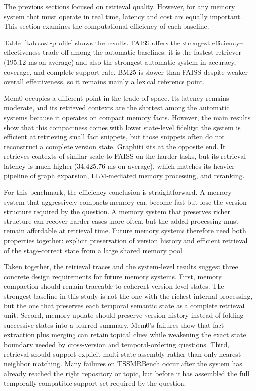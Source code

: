 The previous sections focused on retrieval quality. However, for any memory system that must operate in real time, latency and cost are equally important. This section examines the computational efficiency of each baseline.

Table~\ref{tab:cost-profile} shows the results. FAISS offers the strongest efficiency--effectiveness trade-off among the automatic baselines: it is the fastest retriever (195.12 ms on average) and also the strongest automatic system in accuracy, coverage, and complete-support rate. BM25 is slower than FAISS despite weaker overall effectiveness, so it remains mainly a lexical reference point.

Mem0 occupies a different point in the trade-off space. Its latency remains moderate, and its retrieved contexts are the shortest among the automatic systems because it operates on compact memory facts. However, the main results show that this compactness comes with lower state-level fidelity: the system is efficient at retrieving small fact snippets, but those snippets often do not reconstruct a complete version state. Graphiti sits at the opposite end. It retrieves contexts of similar scale to FAISS on the harder tasks, but its retrieval latency is much higher (34{,}425.76 ms on average), which matches its heavier pipeline of graph expansion, LLM-mediated memory processing, and reranking.

For this benchmark, the efficiency conclusion is straightforward. A memory system that aggressively compacts memory can become fast but lose the version structure required by the question. A memory system that preserves richer structure can recover harder cases more often, but the added processing must remain affordable at retrieval time. Future memory systems therefore need both properties together: explicit preservation of version history and efficient retrieval of the stage-correct state from a large shared memory pool.

Taken together, the retrieval traces and the system-level results suggest three concrete design requirements for future memory systems. First, memory compaction should remain traceable to coherent version-level states. The strongest baseline in this study is not the one with the richest internal processing, but the one that preserves each temporal semantic state as a complete retrieval unit. Second, memory update should preserve version history instead of folding successive states into a blurred summary. Mem0's failures show that fact extraction plus merging can retain topical clues while weakening the exact state boundary needed by cross-version and temporal-ordering questions. Third, retrieval should support explicit multi-state assembly rather than only nearest-neighbor matching. Many failures on TSSMRBench occur after the system has already reached the right repository or topic, but before it has assembled the full temporally compatible support set required by the question.


